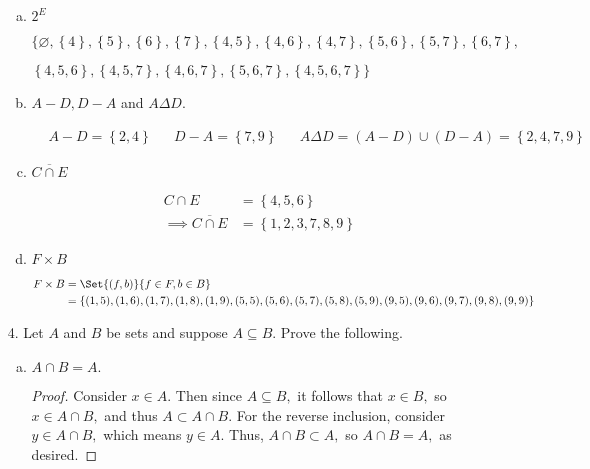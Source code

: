 \documentclass{article}
\begin{document}
\begin{itemize}
\begin{enumerate}[(a)]
			\item $2^E$
				\begin{answer*}
					$\{ \varnothing, \left\{ 4 \right\}, \left\{ 5 \right\}, \left\{ 6 \right\}, \left\{ 7 \right\}, \left\{ 4, 5 \right\}, \left\{ 4, 6 \right\}, \left\{ 4, 7 \right\}, \left\{ 5, 6 \right\}, \left\{ 5, 7 \right\}, \left\{ 6, 7 \right\}, $
					
					$\left\{ 4, 5, 6 \right\}, \left\{ 4, 5, 7 \right\}, \left\{ 4, 6, 7 \right\}, \left\{ 5, 6, 7 \right\}, \left\{ 4, 5, 6, 7 \right\} \}$
				\end{answer*}

			\item $A-D, D-A$ and $A\Delta D.$
				\begin{answer*}
					\begin{align*}
						& A-D = \left\{ 2, 4 \right\} & & D-A = \left\{ 7, 9 \right\} & & A\Delta D=(A-D)\cup(D-A)=\left\{ 2, 4, 7, 9 \right\}
					\end{align*}
				\end{answer*}

			\item $\overline{C\cap E}$
				\begin{answer*}
					\begin{align*}
						C\cap E &= \left\{ 4, 5, 6 \right\} \\
						\implies \overline{C\cap E} &= \left\{ 1, 2, 3, 7, 8, 9 \right\}
					\end{align*}
				\end{answer*}

			\item $F\times B$
				\begin{answer*}
					\begin{align*}
						F\times B &= \Set{(f, b)}{f\in F, b\in B} \\
						&= \left\{ (1, 5), (1, 6), (1, 7), (1, 8), (1, 9), (5, 5), (5, 6), (5, 7), (5, 8), (5, 9), (9, 5), (9, 6), (9, 7), (9, 8), (9, 9) \right\}
					\end{align*}
				\end{answer*}
				
		\end{enumerate}

	\item[4.] Let $A$ and $B$ be sets and suppose $A\subseteq B.$ Prove the following.
		\begin{enumerate}[(a)]
			\item $A\cap B=A.$
				\begin{proof}
					Consider $x\in A.$ Then since $A\subseteq B,$ it follows that $x\in B,$ so $x\in A\cap B,$ and thus $A\subset A\cap B.$ For the reverse inclusion, consider $y\in A\cap B,$ which means $y\in A.$ Thus, $A\cap B\subset A,$ so $A\cap B=A,$ as desired.
				\end{proof}


\end{enumerate}
\end{itemize}
\end{document}
